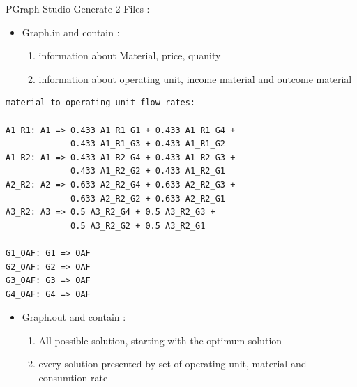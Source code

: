 PGraph Studio Generate 2 Files : 
\begin{itemize}
	\item Graph.in and contain :
		\begin{enumerate}
			\item information about Material, price, quanity
			\item information about operating unit, income material and outcome material 
 	\end{enumerate}

\end{itemize}

\begin{lstlisting}[caption=Part from Graph.in]
material_to_operating_unit_flow_rates:

A1_R1: A1 => 0.433 A1_R1_G1 + 0.433 A1_R1_G4 +
			 0.433 A1_R1_G3 + 0.433 A1_R1_G2
A1_R2: A1 => 0.433 A1_R2_G4 + 0.433 A1_R2_G3 + 
			 0.433 A1_R2_G2 + 0.433 A1_R2_G1
A2_R2: A2 => 0.633 A2_R2_G4 + 0.633 A2_R2_G3 + 
			 0.633 A2_R2_G2 + 0.633 A2_R2_G1
A3_R2: A3 => 0.5 A3_R2_G4 + 0.5 A3_R2_G3 + 
			 0.5 A3_R2_G2 + 0.5 A3_R2_G1
			 
G1_OAF: G1 => OAF
G2_OAF: G2 => OAF
G3_OAF: G3 => OAF
G4_OAF: G4 => OAF

\end{lstlisting}



\begin{itemize}
	\item Graph.out and contain :
		\begin{enumerate}
			\item All possible solution, starting with the optimum solution 
			\item every solution presented by set of  operating unit, material and consumtion rate  
 	\end{enumerate}

\end{itemize}



